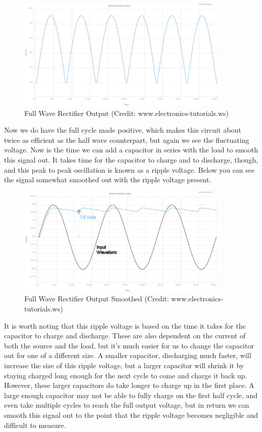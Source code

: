 \documentclass[prb,preprint]{revtex4-1}
\begin{document}
\begin{figure}[ht]
	\centering
	\includegraphics[width=4in]{waveform-1.jpg}
	\caption{Full Wave Rectifier Output (Credit: www.electronics-tutorials.ws)}
	\label{fig1}
\end{figure}

Now we do have the full cycle made positive, which makes this circuit about twice as efficient as the half wave counterpart, but again we see the fluctuating voltage.
Now is the time we can add a capacitor in series with the load to smooth this signal out. It takes time for the capacitor to charge and to discharge, though, and this peak to peak oscillation is known as a ripple voltage. Below you can see the signal somewhat smoothed out with the ripple voltage present.

\begin{figure}[ht]
	\centering
	\includegraphics[width=4in]{smoothcap.jpg}
	\caption{Full Wave Rectifier Output Smoothed (Credit: www.electronics-tutorials.ws)}
	\label{fig1}
\end{figure}

It is worth noting that this ripple voltage is based on the time it takes for the capacitor to charge and discharge. These are also dependent on the current of both the source and the load, but it's much easier for us to change the capacitor out for one of a different size. A smaller capacitor, discharging much faster, will increase the size of this ripple voltage, but a larger capacitor will shrink it by staying charged long enough for the next cycle to come and charge it back up. However, these larger capacitors do take longer to charge up in the first place. A large enough capacitor may not be able to fully charge on the first half cycle, and even take multiple cycles to reach the full output voltage, but in return we can smooth this signal out to the point that the ripple voltage becomes negligible and difficult to measure.
\end{document}
